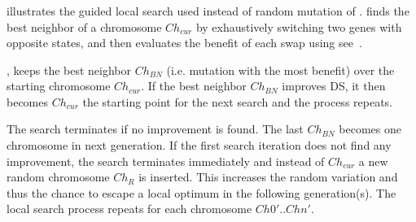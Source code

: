 \subsubsection{\gads}
\label{sec:GALS-DSS}

 illustrates the guided local search used instead of random mutation of \garand. \gads finds the best neighbor of a chromosome $Ch_{cur}$ by exhaustively switching two genes with opposite states, and then evaluates the benefit of each swap using  see~.

, \gads keeps the best neighbor $Ch_{BN}$ (i.e. mutation with the most benefit) over the starting chromosome $Ch_{cur}$. If the best neighbor $Ch_{BN}$ improves DS, it then becomes $Ch_{cur}$ the starting point for the next search and the process repeats. 

The search terminates if no improvement is found. The last $Ch_{BN}$ becomes one chromosome in next generation. If the first search iteration does not find any improvement, the search terminates immediately and instead of $Ch_{cur}$ a new random chromosome $Ch_{R}$ is inserted. This increases the random variation and thus the chance to escape a local optimum in the following generation(s). The local search process repeats for each chromosome $Ch0' .. Chn'$. 



